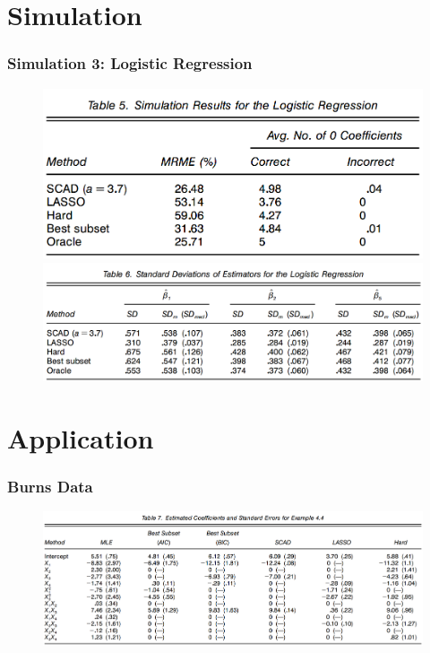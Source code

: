 \documentclass{beamer}
\begin{document}
	\section{Simulation}
	\begin{frame}
		\frametitle{Simulation 3: Logistic Regression}
		\begin{figure}
			\includegraphics[width=0.6\linewidth]{image023.png}
			\includegraphics[width=0.9\linewidth]{image024.png}
		\end{figure}
	\end{frame}
	
	\section{Application}
	\begin{frame}
		\frametitle{Burns Data}
		\begin{figure}
			\includegraphics[width=1\linewidth]{image025.png}
		\end{figure}
	\end{frame}
	
	
	
	
\end{document}
